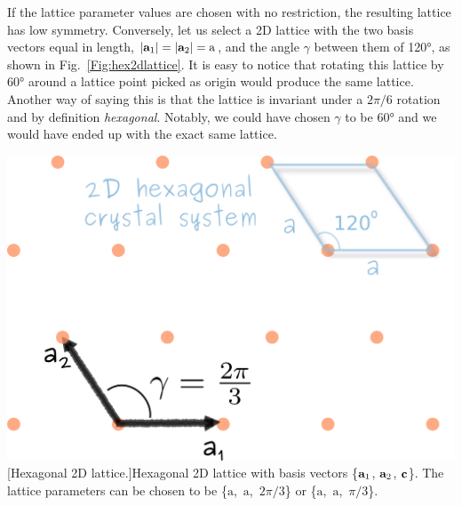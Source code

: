 \noindent \begin{minipage}{0.5\linewidth}
If the lattice parameter values are chosen with no restriction, the resulting lattice has low symmetry. Conversely, let us select a 2D lattice with the two basis vectors equal in length, $|\vb{a}_1|=|\vb{a}_2|=\mathrm{a}$\footnotemark, and the angle $\gamma$ between them of 120\si{\degree}, as shown in Fig.~\ref{Fig:hex2dlattice}. It is easy to notice that rotating this lattice by 60\si{\degree} around a lattice point picked as origin would produce the same lattice. Another way of saying this is that the lattice is invariant under a $2\pi/6$ rotation and by definition \textit{hexagonal}. Notably, we could have chosen $\gamma$ to be 60\si{\degree} and we would have ended up with the exact same lattice. 

\end{minipage}\hspace{0.5cm}
\begin{minipage}{0.5\linewidth}
 \centering
\includegraphics[width=1\linewidth]{Figures/hex2Dlattice.png}
\captionsetup{width=.8\linewidth}
[Hexagonal 2D lattice.]{Hexagonal 2D lattice with basis vectors \{$\vb{a}_1$, $\vb{a}_2$, $\vb{c}$\}. The lattice parameters can be chosen to be \{$\mathrm{a}$,~$\mathrm{a}$,~$2\pi/3$\} or  \{$\mathrm{a}$,~$\mathrm{a}$,~$\pi/3$\}. }
\label{Fig:hex2dlattice}
\end{minipage}
 
\vspace{0.5cm}

